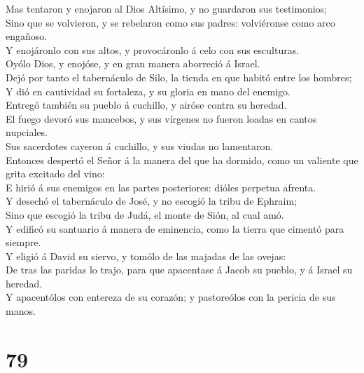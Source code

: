  Mas tentaron y enojaron al Dios Altísimo, y no guardaron
sus testimonios;\\
 Sino que se volvieron, y se rebelaron como sus padres:
volviéronse como arco engañoso.\\
 Y enojáronlo con sus altos, y provocáronlo á celo con sus
esculturas.\\
 Oyólo Dios, y enojóse, y en gran manera aborreció á
Israel.\\
 Dejó por tanto el tabernáculo de Silo, la tienda en que
habitó entre los hombres;\\
 Y dió en cautividad su fortaleza, y su gloria en mano del
enemigo.\\
 Entregó también su pueblo á cuchillo, y airóse contra su
heredad.\\
 El fuego devoró sus mancebos, y sus vírgenes no fueron
loadas en cantos nupciales.\\
 Sus sacerdotes cayeron á cuchillo, y sus viudas no
lamentaron.\\
 Entonces despertó el Señor á la manera del que ha dormido,
como un valiente que grita excitado del vino:\\
 E hirió á sus enemigos en las partes posteriores: dióles
perpetua afrenta.\\
 Y desechó el tabernáculo de José, y no escogió la tribu de
Ephraim;\\
 Sino que escogió la tribu de Judá, el monte de Sión, al
cual amó.\\
 Y edificó su santuario á manera de eminencia, como la
tierra que cimentó para siempre.\\
 Y eligió á David su siervo, y tomólo de las majadas de las
ovejas:\\
 De tras las paridas lo trajo, para que apacentase á Jacob
su pueblo, y á Israel su heredad.\\
 Y apacentólos con entereza de su corazón; y pastoreólos
con la pericia de sus manos.

\hypertarget{section-78}{%
\section{79}\label{section-78}}

